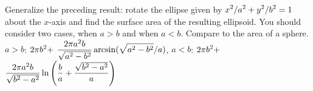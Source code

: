 \exercise Generalize the preceding result: rotate the ellipse
given by $\displaystyle x^2/a^2+y^2/b^2=1$ about the
$x$-axis and find the surface area of the resulting ellipsoid. You
should consider two cases, when $a>b$ and when $a<b$. Compare to the
area of a sphere.
\answer $a>b$: $\displaystyle 2\pi b^2+$\hfill\break
\hbox{\hskip1cm}$\displaystyle {2\pi a^2b\over\sqrt{a^2-b^2}}
  \arcsin(\sqrt{a^2-b^2}/a)$,\hfill\break
$a<b$: $\displaystyle 2\pi b^2+ $\hfill\break
\hbox{\hskip1cm}$\displaystyle {2\pi a^2b\over\sqrt{b^2-a^2}}
  \ln\left({b\over a}+{\sqrt{b^2-a^2}\over a}\right)$
\endanswer
\endexercise

\endexercises
